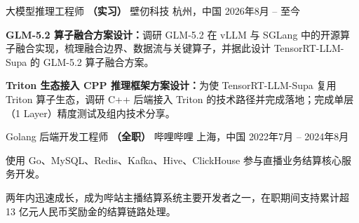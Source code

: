 

\begin{cventries}

  \cventry
    {大模型推理工程师 \textbf{\textcolor{awesome-red}{（实习）}}}
    {壁仞科技}
    {杭州，中国}
    {2026年8月 -- 至今}
    {
      \begin{cvitems}
        \item {\textbf{GLM-5.2 算子融合方案设计：}调研 GLM-5.2 在 vLLM 与 SGLang 中的开源算子融合实现，梳理融合边界、数据流与关键算子，并据此设计 TensorRT-LLM-Supa 的 GLM-5.2 算子融合方案。}
        \item {\textbf{Triton 生态接入 CPP 推理框架方案设计：}为使 TensorRT-LLM-Supa 复用 Triton 算子生态，调研 C++ 后端接入 Triton 的技术路径并完成落地；完成单层（1 Layer）精度测试及组内技术分享。}
      \end{cvitems}
    }

  \cventry
    {Golang 后端开发工程师 \textbf{\textcolor{awesome-red}{（全职）}}}
    {哔哩哔哩}
    {上海，中国}
    {2022年7月 -- 2024年8月}
    {
      \begin{cvitems}
        \item {使用 Go、MySQL、Redis、Kafka、Hive、ClickHouse 参与直播业务结算核心服务开发。}
        \item {两年内迅速成长，成为哔站主播结算系统主要开发者之一，在职期间支持累计超 13 亿元人民币奖励金的结算链路处理。}
      \end{cvitems}
    }

\end{cventries}
